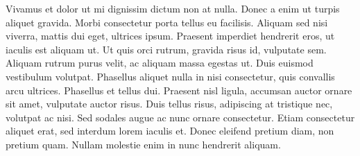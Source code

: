  Vivamus et dolor ut mi dignissim dictum non at nulla. Donec a enim ut turpis aliquet gravida. Morbi consectetur porta tellus eu facilisis. Aliquam sed nisi viverra, mattis dui eget, ultrices ipsum. Praesent imperdiet hendrerit eros, ut iaculis est aliquam ut. Ut quis orci rutrum, gravida risus id, vulputate sem. Aliquam rutrum purus velit, ac aliquam massa egestas ut. Duis euismod vestibulum volutpat. Phasellus aliquet nulla in nisi consectetur, quis convallis arcu ultrices. Phasellus et tellus dui. Praesent nisl ligula, accumsan auctor ornare sit amet, vulputate auctor risus. Duis tellus risus, adipiscing at tristique nec, volutpat ac nisi. Sed sodales augue ac nunc ornare consectetur. Etiam consectetur aliquet erat, sed interdum lorem iaculis et. Donec eleifend pretium diam, non pretium quam. Nullam molestie enim in nunc hendrerit aliquam.